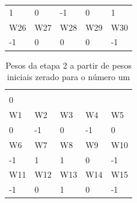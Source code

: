 \documentclass[11pt]{article}
\begin{document}
\begin{table}[h]
\begin{tabular}{lllll}
  1                                                 & 0                          & -1                         & 0                          & 1                          \\
  \rowcolor[HTML]{000000}
  {\color[HTML]{FFFFFF} W26}                        & {\color[HTML]{FFFFFF} W27} & {\color[HTML]{FFFFFF} W28} & {\color[HTML]{FFFFFF} W29} & {\color[HTML]{FFFFFF} W30} \\
  -1                                                & 0                          & 0                          & 0                          & -1
  \end{tabular}
\end{table}

\begin{table}[h]
  \centering
  \caption{Pesos da etapa 2 a partir de pesos iniciais zerado para o número um}
  \label{tab:wp1z_2}
  \begin{tabular}{lllll}
  \cellcolor[HTML]{000000}{\color[HTML]{FFFFFF} W0} &                            &                            &                            &                            \\
  0                                                 &                            &                            &                            &                            \\
  \rowcolor[HTML]{000000}
  {\color[HTML]{FFFFFF} W1}                         & {\color[HTML]{FFFFFF} W2}  & {\color[HTML]{FFFFFF} W3}  & {\color[HTML]{FFFFFF} W4}  & {\color[HTML]{FFFFFF} W5}  \\
  0                                                 & -1                         & 0                          & -1                         & 0                          \\
  \rowcolor[HTML]{000000}
  {\color[HTML]{FFFFFF} W6}                         & {\color[HTML]{FFFFFF} W7}  & {\color[HTML]{FFFFFF} W8}  & {\color[HTML]{FFFFFF} W9}  & {\color[HTML]{FFFFFF} W10} \\
  -1                                                & 1                          & 1                          & 0                          & -1                         \\
  \rowcolor[HTML]{000000}
  {\color[HTML]{FFFFFF} W11}                        & {\color[HTML]{FFFFFF} W12} & {\color[HTML]{FFFFFF} W13} & {\color[HTML]{FFFFFF} W14} & {\color[HTML]{FFFFFF} W15} \\
  -1                                                & 0                          & 1                          & 0                          & -1                         \\

\end{tabular}
\end{table}
\end{document}
